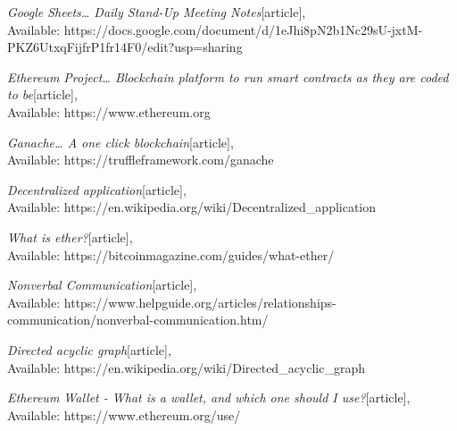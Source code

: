\begin{thebibliography}{}
\emph{Google Sheets… Daily Stand-Up Meeting Notes}[article],\\
Available: {https://docs.google.com/document/d/1eJhi8pN2b1Nc29sU-jxtM-PKZ6UtxqFijfrP1fr14F0/edit?usp=sharing}

\emph{Ethereum Project… Blockchain platform to run smart contracts as they are coded to be}[article],\\
Available: {https://www.ethereum.org}

\emph{Ganache… A one click blockchain}[article],\\
Available: {https://truffleframework.com/ganache}

\emph{Decentralized application}[article],\\
Available: {https://en.wikipedia.org/wiki/Decentralized\_application}

\emph{What is ether?}[article],\\
Available: {https://bitcoinmagazine.com/guides/what-ether/}

\emph{Nonverbal Communication}[article],\\
Available: {https://www.helpguide.org/articles/relationships-communication/nonverbal-communication.htm/}

\emph{Directed acyclic graph}[article],\\
Available: {https://en.wikipedia.org/wiki/Directed\_acyclic\_graph}

\emph{Ethereum Wallet - What is a wallet, and which one should I use?}[article],\\
Available: {https://www.ethereum.org/use/}



\end{thebibliography}

